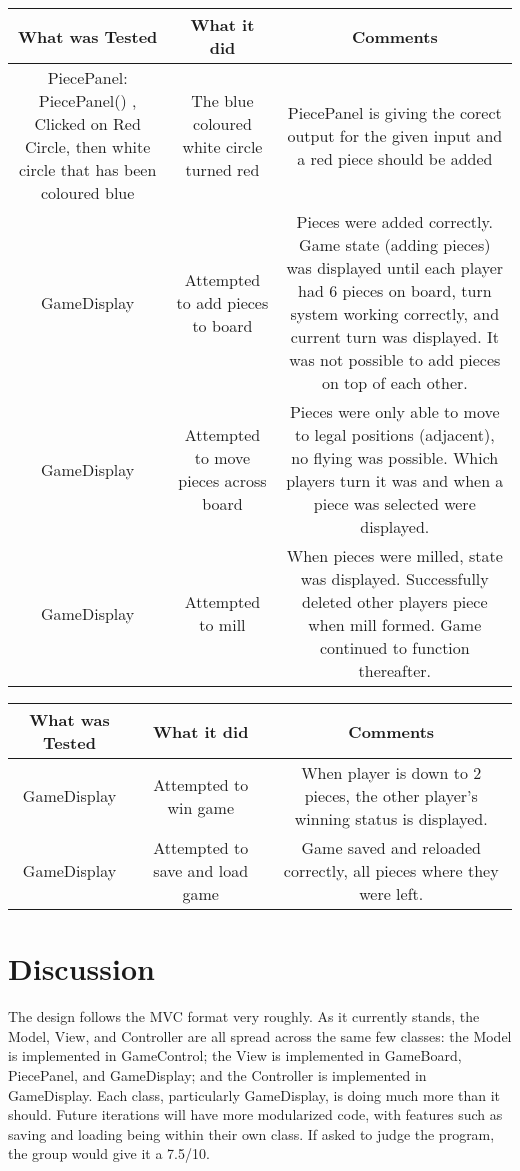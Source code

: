 \documentclass[12pt]{article}
\begin{document}
	\begin{tabularx}{\linewidth}{|C|C|C|}
		\hline
		What was Tested & What it did & Comments \\
		\hline 
		PiecePanel: PiecePanel()  , Clicked on Red Circle, then white circle that has been coloured blue & The blue coloured white circle turned red & PiecePanel is giving the corect output for the given input and a red piece should be added \\
		\hline
		GameDisplay & Attempted to add pieces to board & Pieces were added correctly. Game state (adding pieces) was displayed until each player had 6 pieces on board, turn system working correctly, and current turn was displayed. It was not possible to add pieces on top of each other. \\
		\hline
		GameDisplay & Attempted to move pieces across board & Pieces were only able to move to legal positions (adjacent), no flying was possible. Which players turn it was and when a piece was selected were displayed. \\
		\hline
		GameDisplay & Attempted to mill & When pieces were milled, state was displayed. Successfully deleted other players piece when mill formed. Game continued to function thereafter.\\ 
		\hline
		\end{tabularx}
		\newpage
		\begin{tabularx}{\linewidth}{|C|C|C|}
		\hline
		What was Tested & What it did & Comments \\
		\hline
		GameDisplay & Attempted to win game & When player is down to 2 pieces, the other player's winning status is displayed. \\
		\hline
		GameDisplay & Attempted to save and load game & Game saved and reloaded correctly, all pieces where they were left. \\  
		\hline
	\end{tabularx}
	\section{Discussion}
	The design follows the MVC format very roughly. As it currently stands, the Model, View, and Controller are all spread across the same few classes: the Model is implemented in GameControl; the View is implemented in GameBoard, PiecePanel, and GameDisplay; and the Controller is implemented in GameDisplay. Each class, particularly GameDisplay, is doing much more than it should. Future iterations will have more modularized code, with features such as saving and loading being within their own class. If asked to judge the program, the group would give it a 7.5/10.
\end{document}
